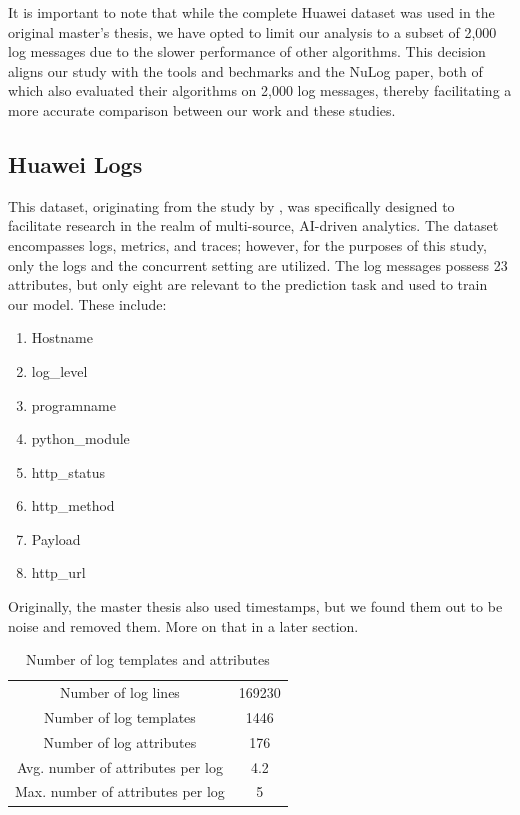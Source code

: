 It is important to note that while the complete Huawei dataset was used in the original master's thesis, we have opted to limit our analysis to a subset of 2,000 log messages due to the slower performance of other algorithms. This decision aligns our study with the tools and bechmarks and the NuLog paper, both of which also evaluated their algorithms on 2,000 log messages, thereby facilitating a more accurate comparison between our work and these studies.

\subsection{Huawei Logs}
\label{sec:Methods:Datasets:Huawei}
This dataset, originating from the study by \cite{10.1007/978-3-030-44769-4_13}, was specifically designed to facilitate research in the realm of multi-source, AI-driven analytics. The dataset encompasses logs, metrics, and traces; however, for the purposes of this study, only the logs and the concurrent setting are utilized. The log messages possess 23 attributes, but only eight are relevant to the prediction task and used to train our model. These include:

\begin{enumerate}
    \item Hostname
    \item log\_level
    \item programname
    \item python\_module
    \item http\_status
    \item http\_method
    \item Payload
    \item http\_url 
\end{enumerate}

Originally, the master thesis also used timestamps, but we found them out to be noise and removed them. More on that in a later section. 

\begin{table}[h]
\centering
\begin{tabular}{c|c}
\hline Number of log lines & 169230 \\
Number of log templates & 1446 \\
Number of log attributes & 176 \\
Avg. number of attributes per log & 4.2 \\
Max. number of attributes per log & 5 \\
\hline
\end{tabular}
\caption{Number of log templates and attributes \cite{witterauf2021domainml}}
\label{tab:logTemplates}
\end{table}

